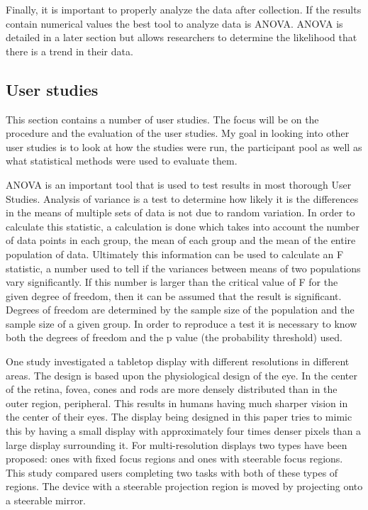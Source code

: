 Finally, it is important to properly analyze the data after collection.  If the results contain numerical values the best tool to analyze data is ANOVA.  ANOVA is detailed in a later section but allows researchers to determine the likelihood that there is a trend in their data.
\subsection{User studies}

This section contains a number of user studies.  The focus will be on the procedure and the evaluation of the user studies.  My goal in looking into other user studies is to look at how the studies were run, the participant pool as well as what statistical methods were used to evaluate them.

ANOVA is an important tool that is used to test results in most thorough User Studies.  Analysis of variance is a test to determine how likely it is the differences in the means of multiple sets of data is not due to random variation.  In order to calculate this statistic, a calculation is done which takes into account the number of data points in each group, the mean of each group and the mean of the entire population of data.  Ultimately this information can be used to calculate an F statistic, a number used to tell if the variances between means of two populations vary significantly.  If this number is larger than the critical value of F for the given degree of freedom, then it can be assumed that the result is significant.  Degrees of freedom are determined by the sample size of the population and the sample size of a given group.  In order to reproduce a test it is necessary to know both the degrees of freedom and the p value (the probability threshold) used. 

One study \cite{1518727} investigated a tabletop display with different resolutions in different areas. The design is based upon the physiological design of the eye.  In the center of the retina, fovea, cones and rods are more densely distributed than in the outer region, peripheral.  This results in humans having much sharper vision in the center of their eyes.  The display being designed in this paper tries to mimic this by having a small display with approximately four times denser pixels than a large display surrounding it.  For multi-resolution displays two types have been proposed: ones with fixed focus regions and ones with steerable focus regions.  This study compared users completing two tasks with both of these types of regions. The device with a steerable projection region is moved by projecting onto a steerable mirror.

